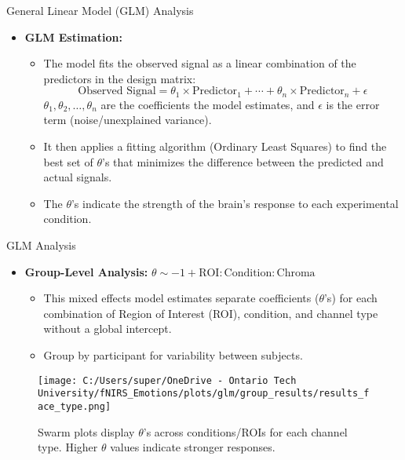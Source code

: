 \documentclass{beamer}
\begin{document}
\begin{frame}{General Linear Model (GLM) Analysis}
    \begin{itemize}
        \item \textbf{GLM Estimation:}
        \begin{itemize}
            \item The model fits the observed signal as a linear combination of the predictors in the design matrix:
            \[
            \text{Observed Signal} = \theta_1 \times \text{Predictor}_1 + \cdots + \theta_n \times \text{Predictor}_n + \epsilon
            \]
            \(\theta_1, \theta_2, \ldots, \theta_n\) are the coefficients the model estimates, and \(\epsilon\) is the error term (noise/unexplained variance).
            \item It then applies a fitting algorithm (Ordinary Least Squares) to find the best set of \(\theta\)'s that minimizes the difference between the predicted and actual signals.
            \item The \(\theta\)'s indicate the strength of the brain's response to each experimental condition.
        \end{itemize}
    \end{itemize}
\end{frame}

\begin{frame}{GLM Analysis}
    \begin{itemize}
      \item \textbf{Group-Level Analysis:} $\theta \sim -1 + \text{ROI}:\text{Condition}:\text{Chroma}$
        \begin{itemize}
            \item This mixed effects model estimates separate coefficients ($\theta$'s) for each combination of Region of Interest (ROI), condition, and channel type without a global intercept. 
            \item Group by participant for variability between subjects.
        \end{itemize}
    \end{itemize}
    \begin{figure}
        \texttt{[image: C:/Users/super/OneDrive - Ontario Tech University/fNIRS\_Emotions/plots/glm/group\_results/results\_face\_type.png]}
        \caption{Swarm plots display $\theta$'s across conditions/ROIs for each channel type. Higher $\theta$ values indicate stronger responses.}
    \end{figure}
\end{frame}
\end{document}
